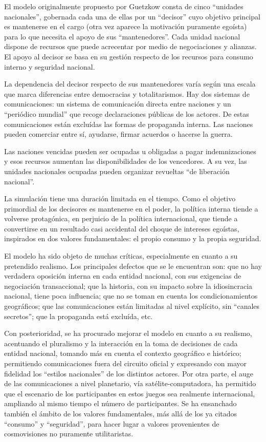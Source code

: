 \documentclass[
]{book}
\begin{document}
El modelo originalmente propuesto por Guetzkow consta de cinco ``unidades nacionales'', gobernada cada una de ellas por un ``decisor'' cuyo objetivo principal es mantenerse en el cargo (otra vez aparece la motivación puramente egoísta) para lo que necesita el apoyo de sus ``mantenedores''. Cada unidad nacional dispone de recursos que puede acrecentar por medio de negociaciones y alianzas. El apoyo al decisor se basa en su gestión respecto de los recursos para consumo interno y seguridad nacional.

La dependencia del decisor respecto de sus mantenedores varía según una escala que marca diferencias entre democracias y totalitarismos. Hay dos sistemas de comunicaciones: un sistema de comunicación directa entre naciones y un ``periódico mundial'' que recoge declaraciones públicas de los actores. De estas comunicaciones están excluídas las formas de propaganda interna. Las naciones pueden comerciar entre sí, ayudarse, firmar acuerdos o hacerse la guerra.

Las naciones vencidas pueden ser ocupadas u obligadas a pagar indemnizaciones y esos recursos aumentan las disponibilidades de los vencedores. A su vez, las unidades nacionales ocupadas pueden organizar revueltas ``de liberación nacional''.

La simulación tiene una duración limitada en el tiempo. Como el objetivo primordial de los decisores es mantenerse en el poder, la política interna tiende a volverse protagónica, en perjuicio de la política internacional, que tiende a convertirse en un resultado casi accidental del choque de intereses egoístas, inspirados en dos valores fundamentales: el propio consumo y la propia seguridad.

El modelo ha sido objeto de muchas críticas, especialmente en cuanto a su pretendido realismo. Los principales defectos que se le encuentran son: que no hay verdadera oposición interna en cada entidad nacional, con sus exigencias de negociación transaccional; que la historia, con su impacto sobre la idiosincracia nacional, tiene poca influencia; que no se toman en cuenta los condicionamientos geográficos; que las comunicaciones están limitadas al nivel explícito, sin ``canales secretos''; que la propaganda está excluída, etc.

Con posterioridad, se ha procurado mejorar el modelo en cuanto a su realismo, acentuando el pluralismo y la interacción en la toma de decisiones de cada entidad nacional, tomando más en cuenta el contexto geográfico e histórico; permitiendo comunicaciones fuera del circuito oficial y expresando con mayor fidelidad los ``estilos nacionales'' de los distintos actores. Por otra parte, el auge de las comunicaciones a nivel planetario, vía satélite-computadora, ha permitido que el escenario de los participantes en estos juegos sea realmente internacional, ampliando al mismo tiempo el número de participantes. Se ha ensanchado también el ámbito de los valores fundamentales, más allá de los ya citados ``consumo'' y ``seguridad'', para hacer lugar a valores provenientes de cosmovisiones no puramente utilitaristas.
\end{document}
